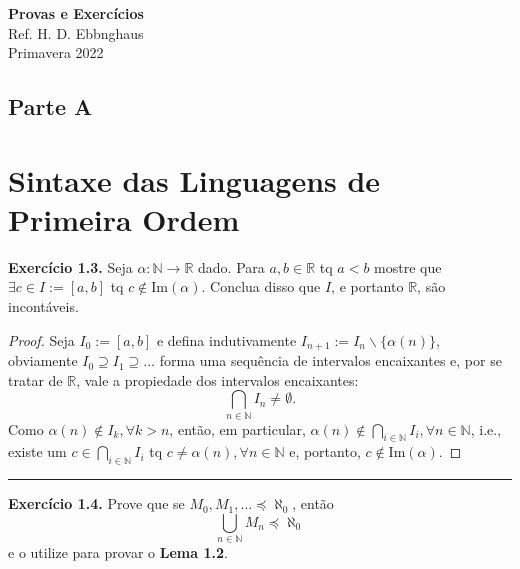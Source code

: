 \documentclass[11pt]{article}
\newcommand{\mbb}[1]{\mathbb{#1}}
\begin{document}
\setcounter{section}{1}
\thispagestyle{empty}

\begin{center}
{\LARGE \bf Provas e Exercícios}\\
{\large Ref. H. D. Ebbnghaus}\\
Primavera 2022
\end{center}

\tableofcontents

\begin{center}
    \section*{Parte A}
\end{center}

\section{Sintaxe das Linguagens de Primeira Ordem}

\begin{shaded}
\textbf{Exercício 1.3.}
Seja $\alpha:\mbb{N}\to\mbb{R}$ dado. Para $a,b\in\mbb{R}$ tq $a<b$ mostre que $\exists c\in I:=[a,b]$ tq $c\notin\text{Im}(\alpha)$. Conclua disso que $I$, e portanto $\mbb{R}$, são incontáveis.
\end{shaded}

\begin{proof}
    Seja $I_0:=[a,b]$ e defina indutivamente $I_{n+1}:=I_n\backslash\{\alpha(n)\}$, obviamente $I_0 \supseteq I_1 \supseteq \dots$ forma uma sequência de intervalos encaixantes e, por se tratar de $\mbb{R}$, vale a propiedade dos intervalos encaixantes:
    $$\bigcap_{n\in\mbb{N}}I_n\ne\emptyset.$$
    Como $\alpha(n)\notin  I_k,\forall k>n$, então, em particular, $\alpha(n)\notin\bigcap_{i\in\mbb{N}}I_i, \forall n\in\mbb{N}$, i.e., existe um $c\in\bigcap_{i\in\mbb{N}}I_i$ tq $c\ne\alpha(n),\forall n\in\mbb{N}$ e, portanto, $c\notin\text{Im}(\alpha)$.
\end{proof}

\hrule

\begin{shaded}
\textbf{Exercício 1.4.}
Prove que se $M_0,M_1,\dots\preceq\aleph_0$, então
\[
\bigcup_{n\in\mbb{N}}M_n\preceq\aleph_0
\]
e o utilize para provar o \textbf{Lema 1.2}.
\end{shaded}
\end{document}
